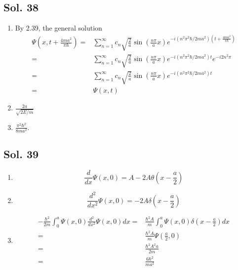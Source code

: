     \subsection*{Sol. 38}
    \begin{enumerate}
        \item 
        By 2.39, the general solution 
        \begin{align*}
            \Psi(x,t+\frac{4ma^2}{\pi\hbar}) = &\sum_{n=1}^\infty 
        c_n\sqrt{\frac{2}{a}}
        \sin(\frac{n\pi}{a}x)
        e^{-i(n^2\pi^2\hbar/2ma^2)
        (t+\frac{4ma^2}{\pi\hbar})}\\
        =& \sum_{n=1}^\infty 
        c_n\sqrt{\frac{2}{a}}
        \sin(\frac{n\pi}{a}x)
        e^{-i(n^2\pi^2\hbar/2ma^2)t}
        e^{-i2n^2\pi}\\
        =&\sum_{n=1}^\infty 
        c_n\sqrt{\frac{2}{a}}
        \sin(\frac{n\pi}{a}x)
        e^{-i(n^2\pi^2\hbar/2ma^2)t}\\
        =& \Psi(x,t)
        \end{align*}
        \item $\frac{2a}{\sqrt{2E/m}}$
        \item $\frac{\pi^2\hbar^2}{8ma^2}.$
    \end{enumerate}

    \subsection*{Sol. 39}
    \begin{enumerate}
        \item 
        $$\frac{d}{dx}
        \Psi(x,0)=A-2A\theta(x-\frac{a}{2})$$
        \item 
        $$\frac{d^2}{dx^2}
        \Psi(x,0)=
        -2A\delta(x-\frac{a}{2})$$
        \item 
        \begin{align*}
            -\frac{\hbar^2}{2m}
            \int_0^a
            \Psi(x,0)
            \frac{d^2}{dx^2}
            \Psi(x,0)dx= & 
            \frac{\hbar^2A}{m}
            \int_0^a
            \Psi(x,0)
            \delta(x-\frac{a}{2})dx\\
            =& \frac{\hbar^2A}{m}\Psi(\frac{a}{2},0)\\
            =&  \frac{\hbar^2A^2a}{2m}\\
            =&  \frac{6\hbar^2}{ma^2}
        \end{align*}
    \end{enumerate}


